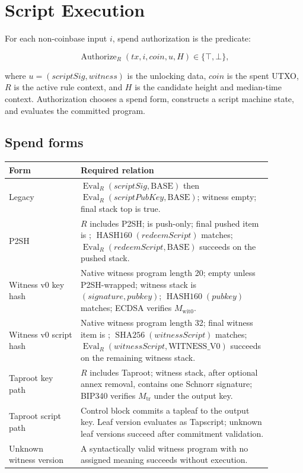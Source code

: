 \section{Script Execution}
\label{sec:script}

For each non-coinbase input \(i\), spend authorization is the predicate:

\[
  \operatorname{Authorize}_{R}(tx,i,coin,u,H) \in \{\top,\bot\},
\]

where \(u=(scriptSig,witness)\) is the unlocking data, \(coin\) is the spent
UTXO, \(R\) is the active rule context, and \(H\) is the candidate height and
median-time context. Authorization chooses a spend form, constructs a script
machine state, and evaluates the committed program.

\subsection{Spend forms}

\begin{longtable}{@{}L{0.24\linewidth}L{0.64\linewidth}@{}}
\toprule
Form & Required relation \\
\midrule
Legacy & \(\operatorname{Eval}_{R}(scriptSig,\mathrm{BASE})\) then \(\operatorname{Eval}_{R}(scriptPubKey,\mathrm{BASE})\); witness empty; final stack top is true. \\
P2SH & \(R\) includes P2SH;  is push-only; final pushed item is ; \(\operatorname{HASH160}(redeemScript)\) matches; \(\operatorname{Eval}_{R}(redeemScript,\mathrm{BASE})\) succeeds on the pushed stack. \\
Witness v0 key hash & Native witness program length 20;  empty unless P2SH-wrapped; witness stack is \((signature,pubkey)\); \(\operatorname{HASH160}(pubkey)\) matches; ECDSA verifies \(M_{\mathrm{wit0}}\). \\
Witness v0 script hash & Native witness program length 32; final witness item is ; \(\operatorname{SHA256}(witnessScript)\) matches; \(\operatorname{Eval}_{R}(witnessScript,\mathrm{WITNESS\_V0})\) succeeds on the remaining witness stack. \\
Taproot key path & \(R\) includes Taproot; witness stack, after optional annex removal, contains one Schnorr signature; BIP340 verifies \(M_{\mathrm{tr}}\) under the output key. \\
Taproot script path & Control block commits a tapleaf to the output key. Leaf version  evaluates as Tapscript; unknown leaf versions succeed after commitment validation. \\
Unknown witness version & A syntactically valid witness program with no assigned meaning succeeds without execution. \\
\bottomrule
\end{longtable}

